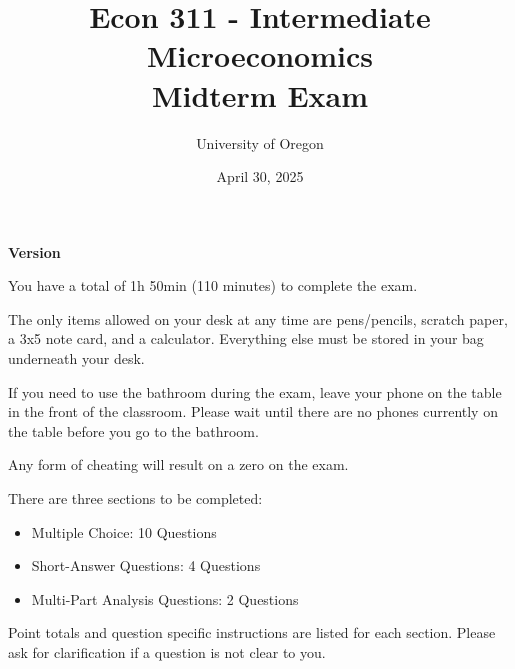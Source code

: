 \documentclass[15pt]{article}
\title{
    \textbf{Econ 311 - Intermediate Microeconomics} \\ 
    Midterm Exam
    }
\author{University of Oregon}
\date{April 30, 2025}
\begin{document}
\maketitle


\begin{center}
  \Large{\textbf{Version }}
\end{center}

\begin{center}
\end{center}

\vspace{0.5in}

 

\vspace{0.5in}

You have a total of 1h 50min (110 minutes) to complete the exam.

The only items allowed on your desk at any time are pens/pencils, scratch paper, a 3x5 note card, and a calculator. Everything else must be stored in your bag underneath your desk.

If you need to use the bathroom during the exam, leave your phone on the table in the front of the classroom. Please wait until there are no phones currently on the table before you go to the bathroom.

Any form of cheating will result on a zero on the exam.

\vspace{0.25in}

There are three sections to be completed:
\begin{itemize}
  \item Multiple Choice: 10 Questions
  \item Short-Answer Questions: 4 Questions
  \item Multi-Part Analysis Questions: 2 Questions
\end{itemize}

\vspace{0.25in}

Point totals and question specific instructions are listed for each section.
Please ask for clarification if a question is not clear to you.
\end{document}
